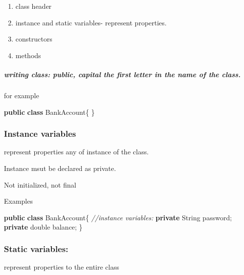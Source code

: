 \documentclass[
  paper=a4,
  ,captions=tableheading
]{scrartcl}
\newenvironment{Shaded}{}{}
\newcommand{\BuiltInTok}[1]{#1}
\newcommand{\CommentTok}[1]{\textcolor[rgb]{0.38,0.63,0.69}{\textit{#1}}}
\newcommand{\DataTypeTok}[1]{\textcolor[rgb]{0.56,0.13,0.00}{#1}}
\newcommand{\KeywordTok}[1]{\textcolor[rgb]{0.00,0.44,0.13}{\textbf{#1}}}
\newcommand{\NormalTok}[1]{#1}
\begin{document}
\begin{enumerate}
\def\labelenumi{\arabic{enumi}.}
\item
  class header
\item
  instance and static variables- represent properties.
\item
  constructors
\item
  methods
\end{enumerate}

\hypertarget{writing-class-public-capital-the-first-letter-in-the-name-of-the-class.}{%
\subparagraph{writing class: public, capital the first letter in the
name of the
class.}\label{writing-class-public-capital-the-first-letter-in-the-name-of-the-class.}}

for example

\begin{Shaded}
\begin{Highlighting}[]
\KeywordTok{public} \KeywordTok{class}\NormalTok{ BankAccount\{}
\NormalTok{\}}
\end{Highlighting}
\end{Shaded}

\hypertarget{instance-variables}{%
\subsubsection{Instance variables}\label{instance-variables}}

represent properties any of instance of the class.

Instance msut be declared as private.

Not initialized, not final

Examples

\begin{Shaded}
\begin{Highlighting}[]
\KeywordTok{public} \KeywordTok{class}\NormalTok{ BankAccount\{}
    \CommentTok{//instance variables:}
    \KeywordTok{private} \BuiltInTok{String}\NormalTok{ password;}
    \KeywordTok{private} \DataTypeTok{double}\NormalTok{ balance;}
\NormalTok{\}}
\end{Highlighting}
\end{Shaded}

\hypertarget{static-variables}{%
\subsubsection{Static variables:}\label{static-variables}}

represent properties to the entire class
\end{document}
